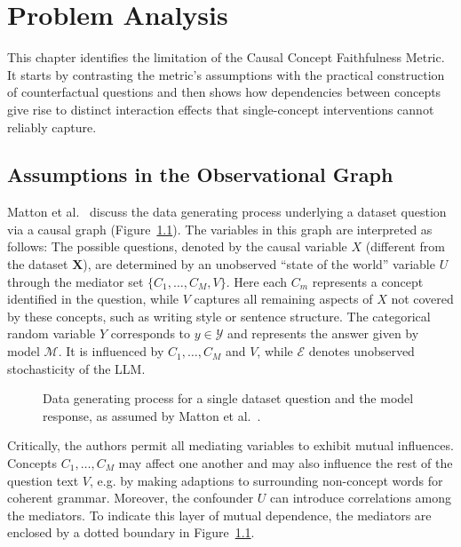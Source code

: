 \chapter{Problem Analysis}
\label{sec:correlated_concepts}
This chapter identifies the limitation of the Causal Concept Faithfulness Metric. It starts by contrasting the metric's assumptions with the practical construction of counterfactual questions and then shows how dependencies between concepts give rise to distinct interaction effects that single-concept interventions cannot reliably capture.

\section{Assumptions in the Observational Graph}
\label{sec:observational_graph}

Matton et al.~\cite{mattonWalkTalkMeasuring2024} discuss the data generating process underlying a dataset question via a causal graph (Figure~\ref{fig:matton_dgp}). The variables in this graph are interpreted as follows: The possible questions, denoted by the causal variable $X$ (different from the dataset $\mathbf{X}$), are determined by an unobserved \enquote{state of the world} variable $U$ through the mediator set $\{C_1,\dots,C_M, V\}$. Here each $C_m$ represents a concept identified in the question, while $V$ captures all remaining aspects of $X$ not covered by these concepts, such as writing style or sentence structure. The categorical random variable $Y$ corresponds to $y \in \mathcal{Y}$ and represents the answer given by model $\mathcal{M}$. It is influenced by $C_1,\dots,C_M$ and $V$, while $\mathcal{E}$ denotes unobserved stochasticity of the LLM.

\begin{figure}[ht]
	\centering
	
	\caption[Data generating process assumed by Matton et al.]{Data generating process for a single dataset question and the model response, as assumed by Matton et al.~\cite{mattonWalkTalkMeasuring2024}.}
	\label{fig:matton_dgp}
\end{figure}

Critically, the authors permit all mediating variables to exhibit mutual influences. Concepts $C_1,\dots,C_M$ may affect one another and may also influence the rest of the question text $V$, e.g. by making adaptions to surrounding non-concept words for coherent grammar. Moreover, the confounder $U$ can introduce correlations among the mediators. To indicate this layer of mutual dependence, the mediators are enclosed by a dotted boundary in Figure~\ref{fig:matton_dgp}.

